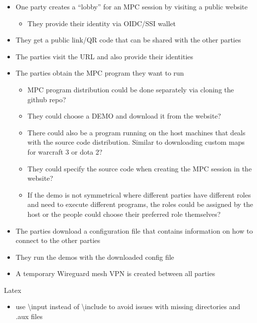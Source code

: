 \begin{frame}
\end{frame}

\begin{frame}
\end{frame}

\begin{frame}
\begin{itemize}
\tightlist
\item
  One party creates a ``lobby'' for an MPC session by visiting a public
  website

  \begin{itemize}
  \tightlist
  \item
    They provide their identity via OIDC/SSI wallet
  \end{itemize}
\item
  They get a public link/QR code that can be shared with the other
  parties
\item
  The parties visit the URL and also provide their identities
\item
  The parties obtain the MPC program they want to run

  \begin{itemize}
  \tightlist
  \item
    MPC program distribution could be done separately via cloning the
    github repo?
  \item
    They could choose a DEMO and download it from the website?
  \item
    There could also be a program running on the host machines that
    deals with the source code distribution. Similar to downloading
    custom maps for warcraft 3 or dota 2?
  \item
    They could specify the source code when creating the MPC session in
    the website?
  \item
    If the demo is not symmetrical where different parties have
    different roles and need to execute different programs, the roles
    could be assigned by the host or the people could choose their
    preferred role themselves?
  \end{itemize}
\item
  The parties download a configuration file that contains information on
  how to connect to the other parties
\item
  They run the demos with the downloaded config file
\item
  A temporary Wireguard mesh VPN is created between all parties
\end{itemize}
\end{frame}

\begin{frame}{Latex}
\protect\hypertarget{latex}{}
\begin{itemize}
\tightlist
\item
  use \textbackslash input instead of \textbackslash include to avoid
  issues with missing directories and .aux files
\end{itemize}
\end{frame}
